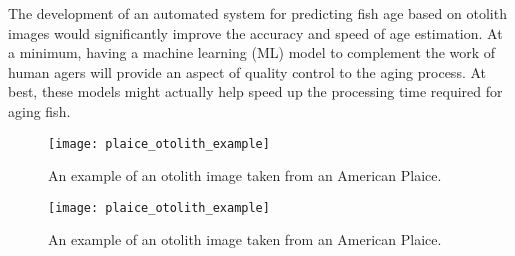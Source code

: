 The development of an automated system for predicting fish age based on otolith images would significantly improve the accuracy and speed of age estimation. At a minimum, having a machine learning (ML) model to complement the work of human agers will provide an aspect of quality control to the aging process. At best, these models might actually help speed up the processing time required for aging fish. 



\begin{figure}
    \texttt{[image: plaice\_otolith\_example]}
    \caption{An example of an otolith image taken from an American Plaice.}
    \label{fig:plaice_oto_example}
\end{figure}

\begin{figure}
    \texttt{[image: plaice\_otolith\_example]}
    \caption{An example of an otolith image taken from an American Plaice.}
    \label{fig:plaice_oto_example}
\end{figure}

